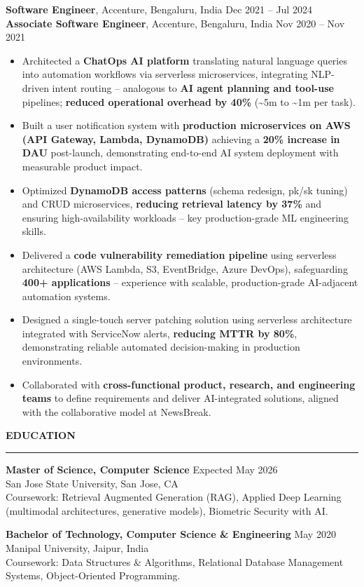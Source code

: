 \documentclass[letterpaper,10.5pt]{extarticle}
\newcommand{\resumesection}[1]{%
    \vspace{6pt}%
    \noindent\textbf{#1}\vspace{-5pt}%
    \\\noindent\rule{\textwidth}{0.5pt}%
    \vspace{1pt}%
}
\begin{document}
\noindent\textbf{Software Engineer}, Accenture, Bengaluru, India \hfill Dec 2021 -- Jul 2024\\
\textbf{Associate Software Engineer}, Accenture, Bengaluru, India \hfill Nov 2020 -- Nov 2021

\begin{itemize}[leftmargin=12pt, topsep=1pt, itemsep=0pt, parsep=0pt]
    \item Architected a \textbf{ChatOps AI platform} translating natural language queries into automation workflows via serverless microservices, integrating NLP-driven intent routing -- analogous to \textbf{AI agent planning and tool-use} pipelines; \textbf{reduced operational overhead by 40\%} (\textasciitilde5m to \textasciitilde1m per task).
    \item Built a user notification system with \textbf{production microservices on AWS (API Gateway, Lambda, DynamoDB)} achieving a \textbf{20\% increase in DAU} post-launch, demonstrating end-to-end AI system deployment with measurable product impact.
    \item Optimized \textbf{DynamoDB access patterns} (schema redesign, pk/sk tuning) and CRUD microservices, \textbf{reducing retrieval latency by 37\%} and ensuring high-availability workloads -- key production-grade ML engineering skills.
    \item Delivered a \textbf{code vulnerability remediation pipeline} using serverless architecture (AWS Lambda, S3, EventBridge, Azure DevOps), safeguarding \textbf{400+ applications} -- experience with scalable, production-grade AI-adjacent automation systems.
    \item Designed a single-touch server patching solution using serverless architecture integrated with ServiceNow alerts, \textbf{reducing MTTR by 80\%}, demonstrating reliable automated decision-making in production environments.
    \item Collaborated with \textbf{cross-functional product, research, and engineering teams} to define requirements and deliver AI-integrated solutions, aligned with the collaborative model at NewsBreak.
\end{itemize}

\resumesection{EDUCATION}

\noindent\textbf{Master of Science, Computer Science} \hfill Expected May 2026\\
San Jose State University, San Jose, CA\\
Coursework: Retrieval Augmented Generation (RAG), Applied Deep Learning (multimodal architectures, generative models), Biometric Security with AI.

\vspace{5pt}

\noindent\textbf{Bachelor of Technology, Computer Science \& Engineering} \hfill May 2020\\
Manipal University, Jaipur, India\\
Coursework: Data Structures \& Algorithms, Relational Database Management Systems, Object-Oriented Programming.
\end{document}
